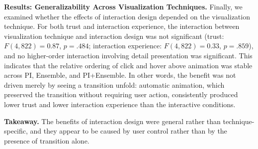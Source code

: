 \noindent\textbf{Results: Generalizability Across Visualization Techniques.}
Finally, we examined whether the effects of interaction design depended on the visualization technique. For both trust and interaction experience, the interaction between visualization technique and interaction design was not significant (trust: $F(4, 822)=0.87$, $p=.484$; interaction experience: $F(4, 822)=0.33$, $p=.859$), and no higher-order interaction involving detail presentation was significant. This indicates that the relative ordering of click and hover above animation was stable across PI, Ensemble, and PI+Ensemble. In other words, the benefit was not driven merely by seeing a transition unfold: automatic animation, which preserved the transition without requiring user action, consistently produced lower trust and lower interaction experience than the interactive conditions.

\noindent\textbf{Takeaway.}
The benefits of interaction design were general rather than technique-specific, and they appear to be caused by user control rather than by the presence of transition alone.
